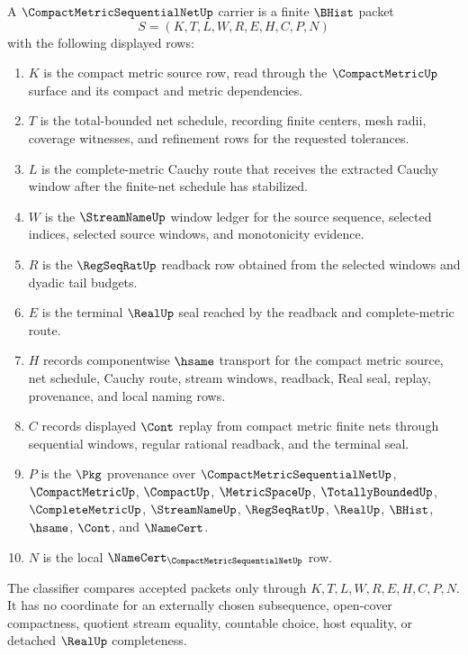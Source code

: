 \begin{definition}
\label{def:compact-metric-sequential-net-carrier}
A $\CompactMetricSequentialNetUp$ carrier is a finite $\BHist$ packet
$$
S=(K,T,L,W,R,E,H,C,P,N)
$$
with the following displayed rows:
\begin{enumerate}
\item $K$ is the compact metric source row, read through the $\CompactMetricUp$ surface and its compact and metric dependencies.
\item $T$ is the total-bounded net schedule, recording finite centers, mesh radii, coverage witnesses, and refinement rows for the requested tolerances.
\item $L$ is the complete-metric Cauchy route that receives the extracted Cauchy window after the finite-net schedule has stabilized.
\item $W$ is the $\StreamNameUp$ window ledger for the source sequence, selected indices, selected source windows, and monotonicity evidence.
\item $R$ is the $\RegSeqRatUp$ readback row obtained from the selected windows and dyadic tail budgets.
\item $E$ is the terminal $\RealUp$ seal reached by the readback and complete-metric route.
\item $H$ records componentwise $\hsame$ transport for the compact metric source, net schedule, Cauchy route, stream windows, readback, Real seal, replay, provenance, and local naming rows.
\item $C$ records displayed $\Cont$ replay from compact metric finite nets through sequential windows, regular rational readback, and the terminal seal.
\item $P$ is the $\Pkg$ provenance over $\CompactMetricSequentialNetUp$, $\CompactMetricUp$, $\CompactUp$, $\MetricSpaceUp$, $\TotallyBoundedUp$, $\CompleteMetricUp$, $\StreamNameUp$, $\RegSeqRatUp$, $\RealUp$, $\BHist$, $\hsame$, $\Cont$, and $\NameCert$.
\item $N$ is the local $\NameCert_{\CompactMetricSequentialNetUp}$ row.
\end{enumerate}
The classifier compares accepted packets only through $K,T,L,W,R,E,H,C,P,N$. It has no coordinate for an externally chosen subsequence, open-cover compactness, quotient stream equality, countable choice, host equality, or detached $\RealUp$ completeness.
\end{definition}

